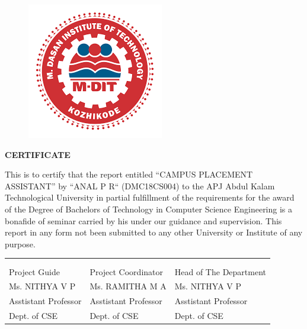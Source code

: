 \documentclass[12pt]{article}
\begin{document}
\begin{changemargin}{0.5cm}{0.5cm}
\begin{figure}[H]
\begin{center}
\includegraphics[scale=.4]{MDIT}
\end{center} 
\end{figure}
\begin{center}\LARGE\bf{CERTIFICATE} \end{center}
\vspace{5mm}
\justifying
This is to certify that the report entitled “CAMPUS PLACEMENT ASSISTANT” by “ANAL P R“ (DMC18CS004) to the APJ Abdul Kalam Technological University in partial fulfillment of the requirements for the award of the Degree of Bachelors of Technology in Computer Science Engineering is a bonafide of seminar carried by his under our guidance and supervision. This report in any form not been submitted to any other University or Institute of any purpose.
\thispagestyle{empty}
\begin{center}
\begin{tabularx}{1\textwidth} { 
  >{\raggedright\arraybackslash}X 
   >{\raggedright\arraybackslash}X 
   >{\raggedright\arraybackslash}X }
 
\\  \\ \\ 

Project Guide & Project Coordinator & Head of The Department  \\  

Ms. NITHYA V P  & Ms. RAMITHA M A & Ms. NITHYA V P \\ 

Asstistant Professor & Asstistant Professor &Asstistant Professor \\  

Dept. of CSE & Dept. of CSE & Dept. of CSE   


\end{tabularx}
\end{center}


\end{changemargin}
\end{document}
